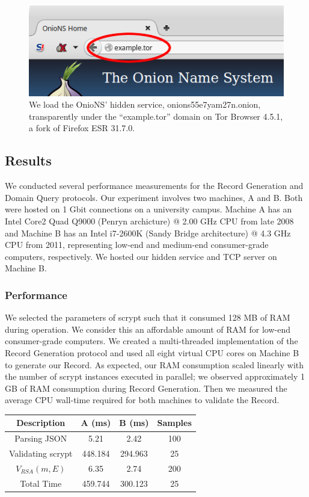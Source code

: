 \documentclass{sig-alternate}
\begin{document}
\begin{figure}[h]
	\centering
	\includegraphics[width=\linewidth]{../images/example.png}
	\caption{We load the OnioNS' hidden service, onions55e7yam27n.onion, transparently under the ``example.tor'' domain on Tor Browser 4.5.1, a fork of Firefox ESR 31.7.0.}
	\label{fig:cumulativeProbability}
\end{figure}

\subsection{Results}

We conducted several performance measurements for the Record Generation and Domain Query protocols. Our experiment involves two machines, A and B. Both were hosted on 1 Gbit connections on a university campus. Machine A has an Intel Core2 Quad Q9000 (Penryn archicture) @ 2.00 GHz CPU from late 2008 and Machine B has an Intel i7-2600K (Sandy Bridge architecture) @ 4.3 GHz CPU from 2011, representing low-end and medium-end consumer-grade computers, respectively. We hosted our hidden service and TCP server on Machine B.

\subsubsection{Performance}

We selected the parameters of scrypt such that it consumed 128 MB of RAM during operation. We consider this an affordable amount of RAM for low-end consumer-grade computers. We created a multi-threaded implementation of the Record Generation protocol and used all eight virtual CPU cores on Machine B to generate our Record. As expected, our RAM consumption scaled linearly with the number of scrypt instances executed in parallel; we observed approximately 1 GB of RAM consumption during Record Generation. Then we measured the average CPU wall-time required for both machines to validate the Record.

\renewcommand{\arraystretch}{1}
\begin{center}
    \begin{tabular}{ | c | c | c | c |}
    \hline
    \textbf{Description} & \textbf{A (ms)} & \textbf{B (ms)} & \textbf{Samples} \\ \hline
    Parsing JSON & 5.21 & 2.42 & 100 \\ \hline
	Validating scrypt & 448.184 & 294.963 & 25 \\ \hline
	$ V_{\mathit{RSA}}(m, E) $ & 6.35 & 2.74 & 200 \\ \hline
	Total Time & 459.744 & 300.123 & 25 \\ \hline
    \end{tabular}
\end{center}
\end{document}
